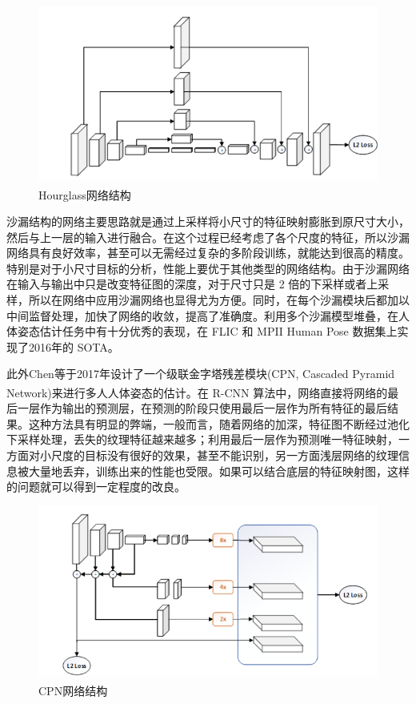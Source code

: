 \begin{figure}[h]
	\centering
	\includegraphics[scale=0.4]{figures/16.png}
	\caption{Hourglass网络结构\textsuperscript{\cite{p23}}}
	\label{fig:f16}
\end{figure}

沙漏结构的网络主要思路就是通过上采样将小尺寸的特征映射膨胀到原尺寸大小，然后与上一层的输入进行融合。在这个过程已经考虑了各个尺度的特征，所以沙漏网络具有良好效率，甚至可以无需经过复杂的多阶段训练，就能达到很高的精度。特别是对于小尺寸目标的分析，性能上要优于其他类型的网络结构。由于沙漏网络在输入与输出中只是改变特征图的深度，对于尺寸只是 2 倍的下采样或者上采样，所以在网络中应用沙漏网络也显得尤为方便。同时，在每个沙漏模块后都加以中间监督处理，加快了网络的收敛，提高了准确度。利用多个沙漏模型堆叠，在人体姿态估计任务中有十分优秀的表现，在 FLIC 和 MPII Human Pose 数据集上实现了2016年的 SOTA。

此外Chen等于2017年设计了一个级联金字塔残差模块(CPN, Cascaded  Pyramid Network)\textsuperscript{\cite{p24}}来进行多人人体姿态的估计。在 R-CNN 算法中，网络直接将网络的最后一层作为输出的预测层，在预测的阶段只使用最后一层作为所有特征的最后结果。这种方法具有明显的弊端，一般而言，随着网络的加深，特征图不断经过池化下采样处理，丢失的纹理特征越来越多；利用最后一层作为预测唯一特征映射，一方面对小尺度的目标没有很好的效果，甚至不能识别，另一方面浅层网络的纹理信息被大量地丢弃，训练出来的性能也受限。如果可以结合底层的特征映射图，这样的问题就可以得到一定程度的改良。

\begin{figure}[h]
	\centering
	\includegraphics[scale=0.4]{figures/17.png}
	\caption{CPN网络结构\textsuperscript{\cite{p24}}}
	\label{fig:f17}
\end{figure}

